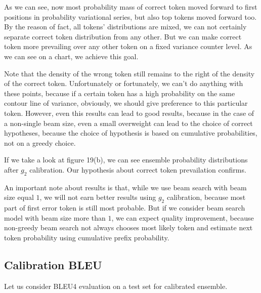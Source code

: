 \documentclass[a4paper,14pt]{extarticle}
\begin{document}
	As we can see, now most probability mass of correct token moved forward to first positions in probability variational series, but also top tokens moved forward too. By the reason of fact, all tokens' distributions are mixed, we can not certainly separate correct token distribution from any other. But we can make correct token more prevailing over any other token on a fixed variance counter level. As we can see on a chart, we achieve this goal.
	
	Note that the density of the wrong token still remains to the right of the density of the correct token. Unfortunately or fortunately, we can't do anything with these points, because if a certain token has a high probability on the same contour line of variance, obviously, we should give preference to this particular token. However, even this results can lead to good results, because in the case of a non-single beam size, even a small overweight can lead to the choice of correct hypotheses, because the choice of hypothesis is based on cumulative probabilities, not on a greedy choice.
	
	If we take a look at figure 19(b), we can see ensemble probability distributions after $g_2$ calibration. Our hypothesis about correct token prevailation confirms.
	
	An important note about results is that, while we use beam search with beam size equal $1$, we will not earn better results using $g_2$ calibration, because most part of first error token is still most probable. But if we consider beam search model with beam size more than $1$, we can expect quality improvement, because non-greedy beam search not always chooses most likely token and estimate next token probability using cumulative prefix probability.

\subsection{Calibration BLEU}
	Let us consider BLEU4 evaluation on a test set for calibrated ensemble.
	
\end{document}
